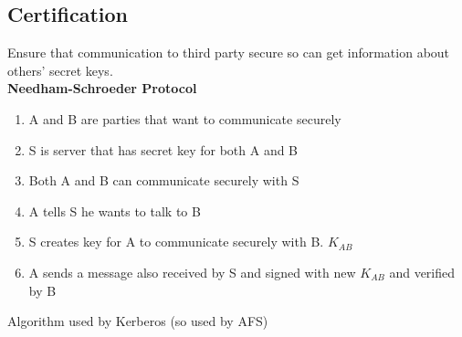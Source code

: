 \documentclass{article}
\begin{document}
	\subsection{Certification}
		Ensure that communication to third party secure so can get information about others' secret keys.\\
		
		\textbf{Needham-Schroeder Protocol}
		\begin{enumerate}
			\item A and B are parties that want to communicate securely
			\item S is server that has secret key for both A and B
			\item Both A and B can communicate securely with S
			\item A tells S he wants to talk to B
			\item S creates key for A to communicate securely with B. $K_{AB}$
			\item A sends a message also received by S and signed with new $K_{AB}$ and verified by B
		\end{enumerate}
		Algorithm used by Kerberos (so used by AFS)
	
\end{document}
